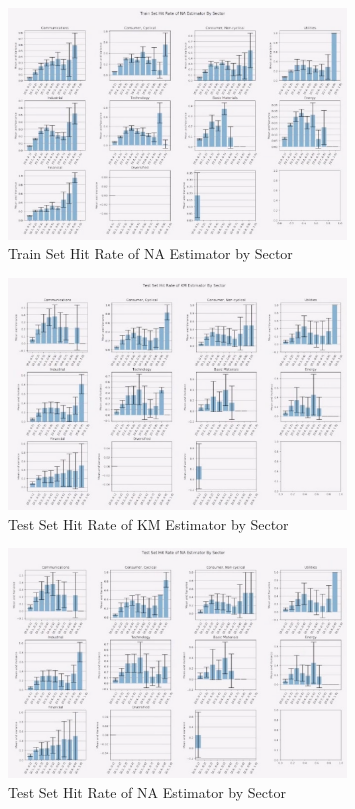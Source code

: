 \begin{figure}[H]
    \centering
    \includegraphics[width=0.8\textwidth]{figures/jpm/15. Train Set Hit Rate of NA Estimator By Sector.png}
    \caption{Train Set Hit Rate of NA Estimator by Sector}
    \label{fig:train_hit_rate_na_sector}
\end{figure}

\begin{figure}[H]
    \centering
    \includegraphics[width=0.8\textwidth]{figures/jpm/16. Test Set Hit Rate of KM Estimator By Sector.png}
    \caption{Test Set Hit Rate of KM Estimator by Sector}
    \label{fig:test_hit_rate_km_sector}
\end{figure}

\begin{figure}[H]
    \centering
    \includegraphics[width=0.8\textwidth]{figures/jpm/17. Test Set Hit Rate of NA Estimator By Sector.png}
    \caption{Test Set Hit Rate of NA Estimator by Sector}
    \label{fig:test_hit_rate_na_sector}
\end{figure}

